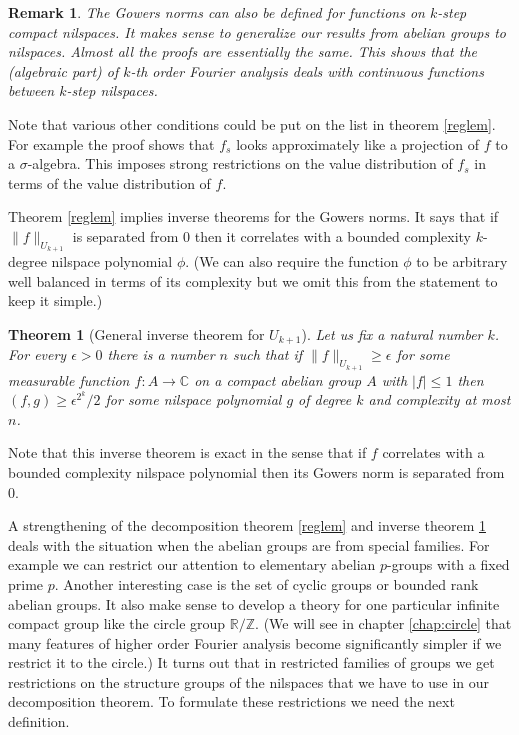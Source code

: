 \documentclass [11pt] {article}
\newtheorem{theorem}{Theorem}
\newtheorem{remark}{Remark}[section]
\begin{document}
\begin{remark} The Gowers norms can also be defined for functions on $k$-step compact nilspaces. It makes sense to generalize our results from abelian groups to nilspaces. Almost all the proofs are essentially the same. This shows that the (algebraic part) of $k$-th order Fourier analysis deals with continuous functions between $k$-step nilspaces. 
\end{remark}

Note that various other conditions could be put on the list in theorem \ref{reglem}.
For example the proof shows that $f_s$ looks approximately like a projection of $f$ to a $\sigma$-algebra. This imposes strong restrictions on the value distribution of $f_s$ in terms of the value distribution of $f$. 

Theorem \ref{reglem} implies inverse theorems for the Gowers norms.
It says that if $\|f\|_{U_{k+1}}$ is separated from $0$ then it correlates with a bounded complexity $k$-degree nilspace polynomial $\phi$.
(We can also require the function $\phi$ to be arbitrary well balanced in terms of its complexity but we omit this from the statement to keep it simple.)

\begin{theorem}[General inverse theorem for $U_{k+1}$]\label{invthem} Let us fix a natural number $k$. For every $\epsilon>0$ there is a number $n$ such that if $\|f\|_{U_{k+1}}\geq\epsilon$ for some measurable function $f:A\rightarrow\mathbb{C}$ on a compact abelian group $A$ with $|f|\leq 1$ then $(f,g)\geq\epsilon^{2^k}/2$ for some nilspace polynomial $g$ of degree $k$ and complexity at most $n$.
\end{theorem}

Note that this inverse theorem is exact in the sense that if $f$ correlates with a bounded complexity nilspace polynomial then its Gowers norm is separated from $0$.

\bigskip

A strengthening of the decomposition theorem \ref{reglem} and inverse theorem \ref{invthem} deals with the situation when the abelian groups are from special families. 
For example we can restrict our attention to elementary abelian $p$-groups with a fixed prime $p$. Another interesting case is the set of cyclic groups or bounded rank abelian groups.
It also make sense to develop a theory for one particular infinite compact group like the circle group $\mathbb{R}/\mathbb{Z}$. (We will see in chapter \ref{chap:circle} that many features of higher order Fourier analysis become significantly simpler if we restrict it to the circle.) 
It turns out that in restricted families of groups we get restrictions on the structure groups of the nilspaces that we have to use in our decomposition theorem. 
To formulate these restrictions we need the next definition.
\end{document}

